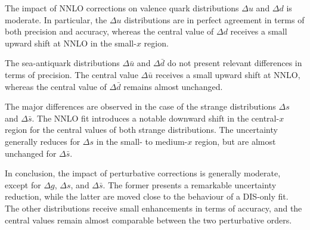 The impact of NNLO corrections on valence quark distributions $\Delta u$ and $\Delta d$ is moderate. In particular, the $\Delta u$ distributions are in perfect agreement in terms of both precision and accuracy, whereas the central value of $\Delta d$ receives a small upward shift at NNLO in the small-$x$ region.%

The sea-antiquark distributions $\Delta \bar{u}$ and $\Delta \bar{d}$ do not present relevant differences in terms of precision. The central value $\Delta \bar{u}$ receives a small upward shift at NNLO, whereas the central value of $\Delta \bar{d}$ remains almost unchanged.%

The major differences are observed in the case of the strange distributions $\Delta s$ and $\Delta \bar{s}$. The NNLO fit introduces a notable downward shift in the central-$x$ region for the central values of both strange distributions. The uncertainty generally reduces for $\Delta s$ in the small- to medium-$x$ region, but are almost unchanged for $\Delta \bar{s}$.%

In conclusion, the impact of perturbative corrections is generally moderate, except for $\Delta g$, $\Delta s$, and $\Delta \bar{s}$. The former presents a remarkable uncertainty reduction, while the latter are moved close to the behaviour of a DIS-only fit. The other distributions receive small enhancements in terms of accuracy, and the central values remain almost comparable between the two perturbative orders.

